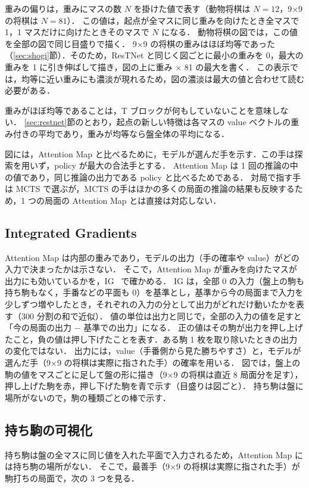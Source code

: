 \documentclass[submit]{ipsj}
\begin{document}
重みの偏りは，重みにマスの数 $N$ を掛けた値で表す（動物将棋は $N = 12$，9×9 の将棋は $N = 81$）．
この値は，起点が全マスに同じ重みを向けたとき全マスで 1，1 マスだけに向けたときそのマスで $N$ になる．
動物将棋の図では，この値を全部の図で同じ目盛りで描く．
9×9 の将棋の重みはほぼ均等であった（\ref{sec:shogi}節）．そのため，ResTNet と同じく図ごとに最小の重みを 0，最大の重みを 1 に引き伸ばして描き，図の上に重み × 81 の最大を書く．
この表示では，均等に近い重みにも濃淡が現れるため，図の濃淡は最大の値と合わせて読む必要がある．

重みがほぼ均等であることは，T ブロックが何もしていないことを意味しない．
\ref{sec:restnet}節のとおり，起点の新しい特徴は各マスの value ベクトルの重み付きの平均であり，重みが均等なら盤全体の平均になる．

図には，Attention Map と比べるために，モデルが選んだ手を示す．この手は探索を用いず，policy が最大の合法手とする．
Attention Map は 1 回の推論の中の値であり，同じ推論の出力である policy と比べるためである．
対局で指す手は MCTS で選ぶが，MCTS の手はほかの多くの局面の推論の結果も反映するため，1 つの局面の Attention Map とは直接は対応しない．

\subsection{Integrated Gradients}
\label{sec:ig}
Attention Map は内部の重みであり，モデルの出力（手の確率や value）がどの入力で決まったかは示さない．
そこで，Attention Map が重みを向けたマスが出力にも効いているかを，IG~\cite{ig} で確かめる．
IG は，全部 0 の入力（盤上の駒も持ち駒もなく，手番などの平面も 0）を基準とし，基準から今の局面まで入力を少しずつ増やしたとき，それぞれの入力の分として出力がどれだけ動いたかを表す（300 分割の和で近似）．
値の単位は出力と同じで，全部の入力の値を足すと「今の局面の出力 − 基準での出力」になる．
正の値はその駒が出力を押し上げたこと，負の値は押し下げたことを表す．ある駒 1 枚を取り除いたときの出力の変化ではない．
出力には，value（手番側から見た勝ちやすさ）と，モデルが選んだ手（9×9 の将棋は実際に指された手）の確率を用いる．
図では，盤上の駒の値をマスごとに足して盤の形に描き（9×9 の将棋は直近 8 局面分を足す），押し上げた駒を赤，押し下げた駒を青で示す（目盛りは図ごと）．
持ち駒は盤に場所がないので，駒の種類ごとの棒で示す．

\subsection{持ち駒の可視化}
持ち駒は盤の全マスに同じ値を入れた平面で入力されるため，Attention Map には持ち駒の場所がない．
そこで，最善手（9×9 の将棋は実際に指された手）が駒打ちの局面で，次の 3 つを見る．
\end{document}
